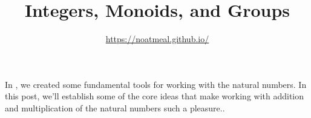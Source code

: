 \documentclass{article}
\title{Integers, Monoids, and Groups}
\author{\url{https://noatmeal.github.io/}}
\date{}
\theoremstyle{definition}
\theoremstyle{definition}
\theoremstyle{plain}
\theoremstyle{remark}
\theoremstyle{plain}
\theoremstyle{remark}
\theoremstyle{plain}
\theoremstyle{plain}
\theoremstyle{plain}
\theoremstyle{plain}
\begin{document}
\maketitle

In \cite{recursion_theorem}, we created some fundamental tools for working with 
the natural numbers. In this post, we'll establish some of the core ideas that 
make working with addition and multiplication of the natural numbers such a 
pleasure..



\end{document}
